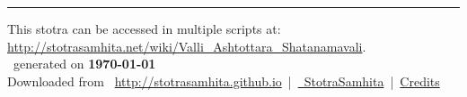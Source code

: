 \documentclass[a5paper,twoside,12pt]{book}
\begin{document}
\setmainfont[Script=Devanagari,Mapping=tex-text]{Sanskrit 2003}
\fontsize {16}{19.25}\selectfont
\let\head\chapt
\begin{center}

\end{center}
\vfill
\centering
\rule{0.8\textwidth}{0.6pt}

\footnotesize
{}\sffamily
This stotra can be accessed in multiple scripts at:\\
\url{http://stotrasamhita.net/wiki/Valli_Ashtottara_Shatanamavali}.\\[1ex]
\faFilePdfO~generated on \textbf{\today}\\[1ex]
Downloaded from \faGlobe{}~\url{http://stotrasamhita.github.io}~|~\href{https://github.com/StotraSamhita}{\faGithubSquare{}~StotraSamhita}~|~\href{https://stotrasamhita.github.io/about/}{Credits}
\end{document}
